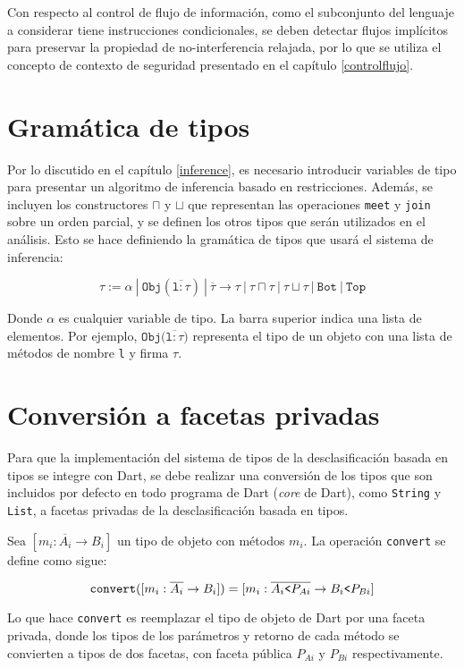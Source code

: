 Con respecto al control de flujo de información, como el subconjunto del lenguaje a considerar tiene instrucciones condicionales, se deben detectar flujos implícitos para preservar la propiedad de no-interferencia relajada, por lo que se utiliza el concepto de contexto de seguridad presentado en el capítulo \ref{controlflujo}.
\clearpage
\section{Gramática de tipos}
Por lo discutido en el capítulo \ref{inference}, es necesario introducir variables de tipo para presentar un algoritmo de inferencia basado en restricciones. Además, se incluyen los constructores $\sqcap$ y $\sqcup$ que representan las operaciones \texttt{meet} y \texttt{join} sobre un orden parcial, y se definen los otros tipos que serán utilizados en el análisis. Esto se hace definiendo la gramática de tipos que usará el sistema de inferencia:

  \[\mathtt{\tau := \alpha\ |\ Obj(\overline{l: \tau})\ |\ \overline{\tau} \rightarrow \tau \ |\ \tau \sqcap \tau\ |\ \tau \sqcup \tau\ |\ Bot\ |\ Top}\]

Donde $\alpha$ es cualquier variable de tipo. La barra superior indica una lista de elementos. Por ejemplo, $\mathtt{Obj(\overline{l: \tau}})$ representa el tipo de un objeto con una lista de métodos de nombre \texttt{l} y firma $\tau$.

\section{Conversión a facetas privadas} \label{conv}
Para que la implementación del sistema de tipos de la desclasificación basada en tipos se integre con Dart, se debe realizar una conversión de los tipos que son incluidos por defecto en todo programa de Dart (\emph{core} de Dart), como \texttt{String} y \texttt{List}, a facetas privadas de la desclasificación basada en tipos.

Sea $[m_i: \overline{A_i} \rightarrow B_i]$ un tipo de objeto con métodos $m_i$. La operación \texttt{convert} se define como sigue:

\[
\mathtt{convert}([m_i: \overline{A_i} \rightarrow B_i]) = [m_i: \overline{A_i\text{\texttt{<}}P_{Ai}} \rightarrow B_i\text{\texttt{<}}P_{Bi}]
\]

Lo que hace \texttt{convert} es reemplazar el tipo de objeto de Dart por una faceta privada, donde los tipos de los parámetros y retorno de cada método se convierten a tipos de dos facetas, con faceta pública $P_{Ai}$ y $P_{Bi}$ respectivamente.

